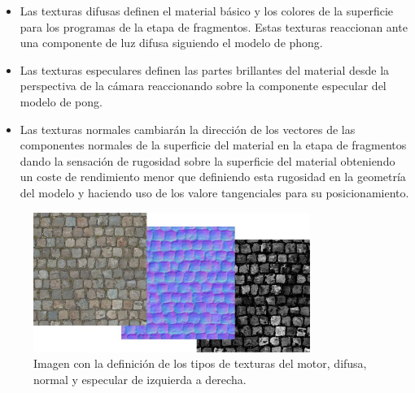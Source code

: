 \documentclass[a4paper]{book}
\begin{document}
\begin{itemize}

\item Las texturas difusas definen el material básico y los colores de la superficie para los programas de la etapa de fragmentos. Estas
texturas reaccionan ante una componente de luz difusa siguiendo el modelo de phong.

\item Las texturas especulares definen las partes brillantes del material desde la perspectiva de la cámara reaccionando sobre la componente
especular del modelo de pong.

\item Las texturas normales cambiarán la dirección de los vectores de las componentes normales de la superficie del material en la etapa de
fragmentos dando la sensación de rugosidad sobre la superficie del material obteniendo un coste de rendimiento menor que definiendo
esta rugosidad en la geometría del modelo y haciendo uso de los valore tangenciales para su posicionamiento.

\end{itemize}

\begin{figure}[H]
    \centering
    \includegraphics[width=9cm, keepaspectratio]{img/custom-textures.jpg}
    \caption{Imagen con la definición de los tipos de texturas del motor, difusa, normal y especular de izquierda a derecha.}
    \label{custom_textures}
\end{figure}
\end{document}
